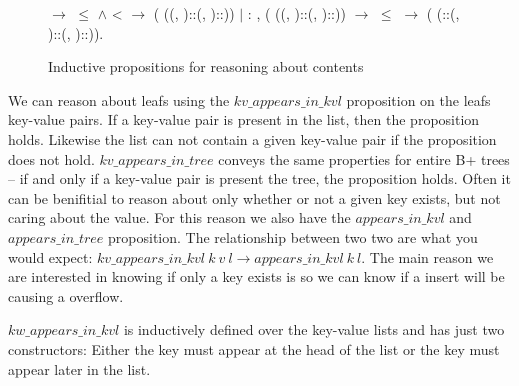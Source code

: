 \begin{figure}
\begin{coqdoccode}
  \coqdocindent{8.00em}
      \ensuremath{\rightarrow}  \ensuremath{\le}  \ensuremath{\land}  <  \ensuremath{\rightarrow}\coqdoceol
  \coqdocindent{8.00em}
     (   ((, )::(, )::))\coqdoceol
  \coqdocindent{1.00em}
  \ensuremath{|} : \coqdockw{\ensuremath{\forall}}      ,\coqdoceol
  \coqdocindent{8.00em}
     (   ((, )::(, )::)) \ensuremath{\rightarrow} \coqdoceol
  \coqdocindent{8.00em}
   \ensuremath{\le}  \ensuremath{\rightarrow}\coqdoceol
  \coqdocindent{8.00em}
     (   (::(, )::(, )::)).\coqdoceol
  \end{coqdoccode}
\caption{Inductive propositions for reasoning about contents}
\label{fig:aik_and_ait}
\end{figure}

We can reason about leafs using the $kv\_appears\_in\_kvl$ proposition on the leafs key-value pairs. If a key-value pair is present in the list, then the proposition holds. Likewise the list can not contain a given key-value pair if the proposition does not hold. $kv\_appears\_in\_tree$ conveys the same properties for entire B+ trees -- if and only if a key-value pair is present the tree, the proposition holds. Often it can be benifitial to reason about only whether or not a given key exists, but not caring about the value. For this reason we also have the $appears\_in\_kvl$ and $appears\_in\_tree$ proposition. The relationship between two two are what you would expect: $kv\_appears\_in\_kvl~k~v~l \rightarrow appears\_in\_kvl~k~l$. The main reason we are interested in knowing if only a key exists is so we can know if a insert will be causing a overflow.

$kw\_appears\_in\_kvl$ is inductively defined over the key-value lists and has just two constructors: Either the key must appear at the head of the list or the key must appear later in the list.


